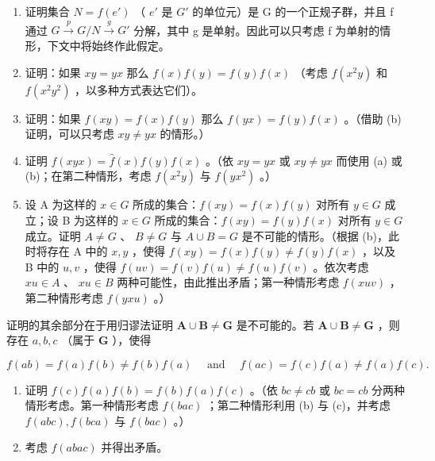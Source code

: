 \begin{enumerate}
\def\labelenumi{(\alph{enumi})}
\item
  证明集合 \(N = f(e')\) （ \(e'\) 是 \(G'\) 的单位元）是 G 的一个正规子群，并且 f 通过 \(G \xrightarrow{p} G/N \xrightarrow{g} G'\) 分解，其中 g 是单射。因此可以只考虑 f 为单射的情形，下文中将始终作此假定。
\item
  证明：如果 \(xy = yx\) 那么 \(f(x)f(y) = f(y)f(x)\) （考虑 \(f(x^2y)\) 和 \(f(x^2y^2)\) ，以多种方式表达它们）。
\item
  证明：如果 \(f(xy) = f(x)f(y)\) 那么 \(f(yx) = f(y)f(x)\) 。（借助 (b) 证明，可以只考虑 \(xy \neq yx\) 的情形。）
\item
  证明 \(f(xyx) = \hat{f}(x)f(y)f(x)\) 。（依 \(xy = yx\) 或 \(xy \neq yx\) 而使用 (a) 或 (b)；在第二种情形，考虑 \(f(x^2y)\) 与 \(f(yx^2)\) 。）
\item
  设 A 为这样的 \(x \in G\) 所成的集合：\(f(xy) = f(x)f(y)\) 对所有 \(y \in G\) 成立；设 B 为这样的 \(x \in G\) 所成的集合：\(f(xy) = f(y)f(x)\) 对所有 \(y \in G\) 成立。证明 \(A \neq G\) 、 \(B \neq G\) 与 \(A \cup B = G\) 是不可能的情形。（根据 (b)，此时将存在 A 中的 \(x, y\) ，使得 \(f(xy) = f(x)f(y) \neq f(y)f(x)\) ，以及 B 中的 \(u, v\) ，使得 \(f(uv) = f(v)f(u) \neq f(u)f(v)\) 。依次考虑 \(xu \in A\) 、 \(xu \in B\) 两种可能性，由此推出矛盾；第一种情形考虑 \(f(xuv)\) ，第二种情形考虑 \(f(yxu)\) 。）
\end{enumerate}

证明的其余部分在于用归谬法证明 \(\mathbf{A} \cup \mathbf{B} \neq \mathbf{G}\) 是不可能的。若 \(\mathbf{A} \cup \mathbf{B} \neq \mathbf{G}\) ，则存在 \(a, b, c\) （属于 \(\mathbf{G}\) ），使得

\[
f (a b) = f (a) f (b) \neq f (b) f (a) \quad \text { and } \quad f (a c) = f (c) f (a) \neq f (a) f (c).
\]

\begin{enumerate}
\def\labelenumi{(\alph{enumi})}
\setcounter{enumi}{5}
\item
  证明 \(f(c)f(a)f(b) = f(b)f(a)f(c)\) 。（依 \(bc \neq cb\) 或 \(bc = cb\) 分两种情形考虑。第一种情形考虑 \(f(bac)\) ；第二种情形利用 (b) 与 (c)，并考虑 \(f(abc), f(bca)\) 与 \(f(bac)\) 。）
\item
  考虑 \(f(abac)\) 并得出矛盾。
\end{enumerate}

